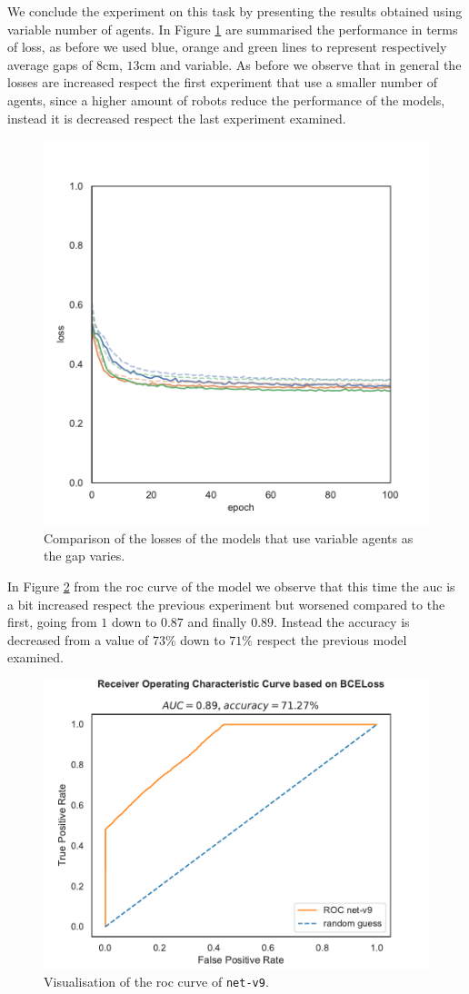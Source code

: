 We conclude the experiment on this task by presenting the results obtained using 
variable number of agents. In Figure \ref{fig:commlossnvart2} are summarised the 
performance in terms of loss, as before we used blue, orange and green lines to 
represent respectively average gaps of $8$\gls{cm}, $13$\gls{cm} and variable. 
As before we observe that in general the losses are increased respect the first 
experiment that use a smaller number of agents, since a higher amount of robots 
reduce the performance of the models, instead it is decreased respect the last 
experiment examined.
\begin{figure}[!htb]
	\centering
	\includegraphics[width=.4\textwidth]{contents/images/task2/loss-communication-Nvar}
	\caption{Comparison of the losses of the models that use variable agents as the 
	gap varies.}
	\label{fig:commlossnvart2}
\end{figure}

\bigskip
\bigskip
In Figure \ref{fig:net-v9auc} from the \gls{roc} curve of the model we 
observe that this time the \gls{auc} is a bit increased respect the previous 
experiment but worsened compared to the first, going from $1$ down to $0.87$ 
and finally $0.89$. Instead the accuracy is decreased from a value of $73\%$ 
down to $71\%$ respect the previous model examined.
\begin{figure}[!htb]
	\centering
	\includegraphics[width=.5\textwidth]{contents/images/net-v9/roc-net-v9}%
	\caption[Evaluation of the \gls{roc} of \texttt{net-v9}.]{Visualisation of the 
		\gls{roc} curve of \texttt{net-v9}.}
	\label{fig:net-v9auc}
\end{figure}

